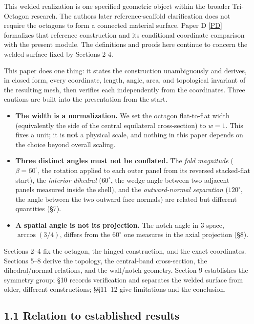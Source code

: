 \documentclass[
  11pt,
  a4paper,
]{article}
\providecommand{\tightlist}{%
  \setlength{\itemsep}{0pt}\setlength{\parskip}{0pt}}
\begin{document}
This welded realization is one specified geometric object within the broader Tri-Octagon research. The author\textquotesingle s later reference-scaffold clarification does not require the octagons to form a connected material surface. Paper D {[}\hyperlink{ref-PD}{PD}{]} formalizes that reference construction and its conditional coordinate comparison with the present module. The definitions and proofs here continue to concern the welded surface fixed by Sections 2-4.

This paper does one thing: it states the construction unambiguously and derives, in closed form, every coordinate, length, angle, area, and topological invariant of the resulting mesh, then verifies each independently from the coordinates. Three cautions are built into the presentation from the start.

\begin{itemize}
\tightlist
\item
  \textbf{The width is a normalization.} We set the octagon flat-to-flat width (equivalently the side of the central equilateral cross-section) to \(w=1\). This fixes a unit; it is \textbf{not} a physical scale, and nothing in this paper depends on the choice beyond overall scaling.
\item
  \textbf{Three distinct angles must not be conflated.} The \emph{fold magnitude} (\(\beta=60^\circ\), the rotation applied to each outer panel from its reversed stacked-flat start), the \emph{interior dihedral} (\(60^\circ\), the wedge angle between two adjacent panels measured inside the shell), and the \emph{outward-normal separation} (\(120^\circ\), the angle between the two outward face normals) are related but different quantities (§7).
\item
  \textbf{A spatial angle is not its projection.} The notch angle in \(3\)-space, \(\arccos(3/4)\), differs from the \(60^\circ\) one measures in the axial projection (§8).
\end{itemize}

Sections 2--4 fix the octagon, the hinged construction, and the exact coordinates. Sections 5--8 derive the topology, the central-band cross-section, the dihedral/normal relations, and the wall/notch geometry. Section 9 establishes the symmetry group; §10 records verification and separates the welded surface from older, different constructions; §§11--12 give limitations and the conclusion.

\subsection{1.1 Relation to established results}\label{relation-to-established-results}
\end{document}
